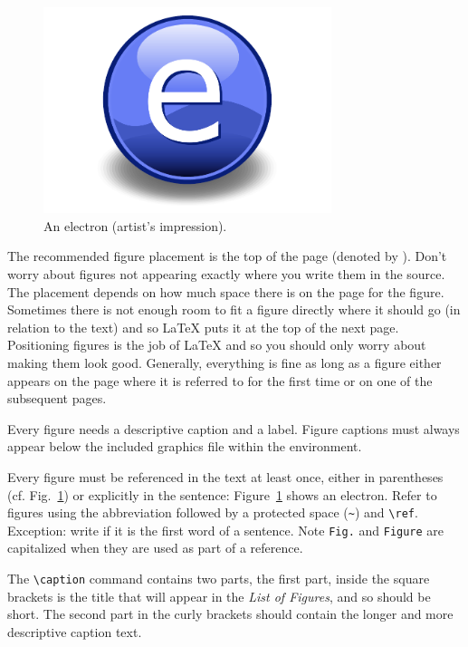 \begin{figure}[t]
\centering
\includegraphics[width=0.75\textwidth]{Figures/Electron}
\decoRule
\caption[An Electron]{An electron (artist's impression).}
\label{fig:Electron}
\end{figure}

The recommended figure placement is the top of the page (denoted by \code{[t]}). Don't worry about figures not appearing exactly where you write them in the source. The placement depends on how much space there is on the page for the figure. Sometimes there is not enough room to fit a figure directly where it should go (in relation to the text) and so LaTeX puts it at the top of the next page. Positioning figures is the job of LaTeX and so you should only worry about making them look good. Generally, everything is fine as long as a figure either appears on the page where it is referred to for the first time or on one of the subsequent pages.

Every figure needs a descriptive caption and a label. Figure captions must always appear below the included graphics file within the  environment.

Every figure must be referenced in the text at least once, either in parentheses (cf. Fig.~\ref{fig:Electron}) or explicitly in the sentence: Figure~\ref{fig:Electron} shows an electron. Refer to figures using the abbreviation  followed by a protected space (\verb|~|) and \verb|\ref|. Exception: write  if it is the first word of a sentence. Note \verb|Fig.| and \verb|Figure| are capitalized when they are used as part of a reference.

The \verb|\caption| command contains two parts,%
the first part, inside the square brackets is the title that will appear in the \emph{List of Figures}, and so should be short.
 The second part in the curly brackets should contain the longer and more descriptive caption text.

